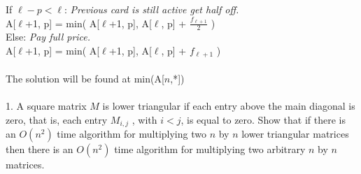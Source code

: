 \documentclass[10pt]{article}
\newcommand{\tabb}{\hspace*{4em}}
\newcommand{\tabbb}{\hspace*{6em}}
\begin{document}
		\tabb If $\ell - p < \ell$: \emph{Previous card is still active get half off.}\\
		\tabbb A[$\ell$+1, p] = min( A[$\ell$+1, p], A[$\ell$, p] + $\frac{f_{\ell+1}}{2}$ )\\
		\tabb Else: \emph{Pay full price.}\\
		\tabbb A[$\ell$+1, p] = min( A[$\ell$+1, p], A[$\ell$, p] + $f_{\ell+1}$ )\\
		\\
		The solution will be found at min(A[$n$,*])\\
	\\
	1.	A square matrix $M$ is lower triangular if each entry above the main diagonal is zero, that is, each entry
		$M_{i,j}$ , with $i < j$, is equal to zero. Show that if there is an $O(n^2)$ time algorithm for multiplying two $n$
		by $n$ lower triangular matrices then there is an $O(n^2)$ time algorithm for multiplying two arbitrary $n$
		by $n$ matrices.
\end{document}
